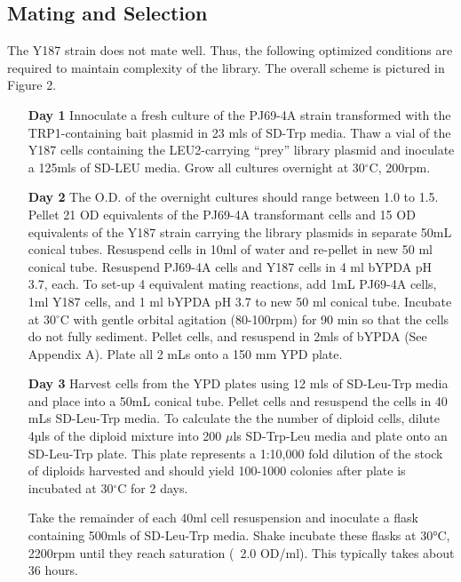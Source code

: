 \documentclass[11pt,fleqn]{book} %
\begin{document}
\subsection{Mating and Selection}

The Y187 strain does not mate well.  Thus, the following optimized conditions are required to maintain complexity of the library.  The overall scheme is pictured in Figure 2.
\vspace{0.1in}
\begin{enumerate}[leftmargin=0.8in]
    \item[\textbf{Day 1}] Innoculate a fresh culture of the PJ69-4A strain transformed with the TRP1-containing bait plasmid in 23 mls of SD-Trp media. Thaw a vial of the Y187 cells containing the LEU2-carrying “prey” library plasmid and inoculate a 125mls of SD-LEU media. Grow all cultures overnight at 30$^\circ$C, 200rpm.
    \item[\textbf{Day 2}] The O.D. of the overnight cultures should range between 1.0 to 1.5.  Pellet 21 OD equivalents of the PJ69-4A transformant cells and 15 OD equivalents of the Y187 strain carrying the library plasmids in separate 50mL conical tubes. Resuspend cells in 10ml of water and re-pellet in new 50 ml conical tube.  Resuspend PJ69-4A cells and Y187 cells in 4 ml bYPDA pH 3.7, each. To set-up 4 equivalent mating reactions, add 1mL PJ69-4A cells, 1ml Y187 cells, and 1 ml bYPDA pH 3.7 to new 50 ml conical tube. Incubate at 30$^\circ$C with gentle orbital agitation (80-100rpm) for 90 min so that the cells do not fully sediment.  Pellet cells, and resuspend in 2mls of bYPDA (See Appendix A). Plate all 2 mLs onto a 150 mm YPD plate.  
    \item[\textbf{Day 3}] Harvest cells from the YPD plates using 12 mls of SD-Leu-Trp media and place into a 50mL conical tube.  Pellet cells and resuspend the cells in 40 mLs SD-Leu-Trp media. To calculate the the number of diploid cells, dilute 4µls of the diploid mixture into 200 $\mu$ls SD-Trp-Leu media and plate onto an SD-Leu-Trp plate.  This plate represents a 1:10,000 fold dilution of the stock of diploids harvested and should yield 100-1000 colonies after plate is incubated at 30$^\circ$C for 2 days. 
    
    Take the remainder of each 40ml cell resuspension and inoculate a flask containing 500mls of SD-Leu-Trp media. Shake incubate these flasks at 30°C, 2200rpm until they reach saturation (~2.0 OD/ml).  This typically takes about 36 hours.  
\end{enumerate}
\end{document}
